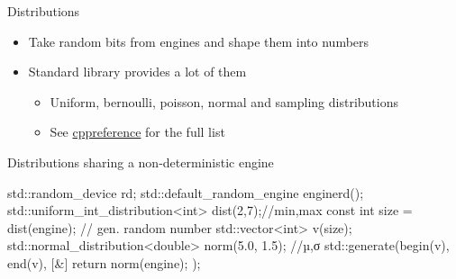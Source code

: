 \begin{frame}[fragile]
  \begin{block}{Distributions}
    \begin{itemize}
      \item Take random bits from engines and shape them into numbers
      \item Standard library provides a lot of them
      \begin{itemize}
        \item Uniform, bernoulli, poisson, normal and sampling distributions
        \item See \href{https://en.cppreference.com/w/cpp/numeric/random}{cppreference} for the full list
      \end{itemize}
    \end{itemize}
  \end{block}
  \begin{exampleblock}{Distributions sharing a non-deterministic engine}
    \begin{cppcode*}{}
      std::random_device rd;
      std::default_random_engine engine{rd()};
      std::uniform_int_distribution<int> dist(2,7);//min,max
      const int size = dist(engine); // gen. random number
      std::vector<int> v(size);
      std::normal_distribution<double> norm(5.0, 1.5); //µ,σ
      std::generate(begin(v), end(v),
                    [&]{ return norm(engine); });
    \end{cppcode*}
  \end{exampleblock}
\end{frame}

